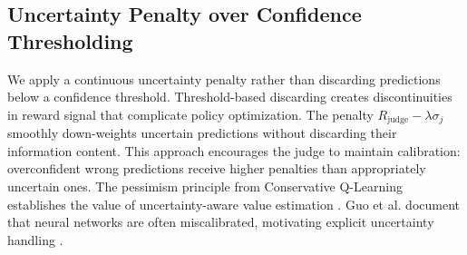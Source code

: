 \documentclass[11pt,a4paper]{article}
\newcommand{\Rjudge}{R_{\text{judge}}}
\begin{document}
\subsection{Uncertainty Penalty over Confidence Thresholding}

We apply a continuous uncertainty penalty rather than discarding predictions below a confidence threshold. Threshold-based discarding creates discontinuities in reward signal that complicate policy optimization. The penalty $\Rjudge - \lambda \sigma_j$ smoothly down-weights uncertain predictions without discarding their information content. This approach encourages the judge to maintain calibration: overconfident wrong predictions receive higher penalties than appropriately uncertain ones. The pessimism principle from Conservative Q-Learning establishes the value of uncertainty-aware value estimation \citep{kumar2020conservative}. Guo et al. document that neural networks are often miscalibrated, motivating explicit uncertainty handling \citep{guo2017calibration}.
\end{document}
